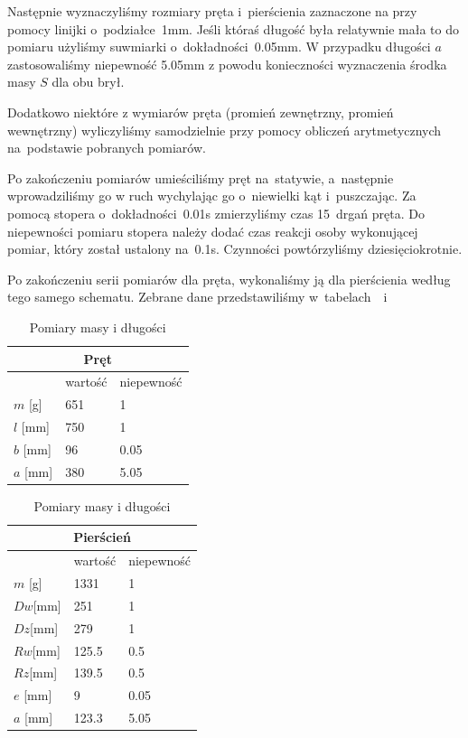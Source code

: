 \documentclass{fizraport}
\begin{document}
Następnie wyznaczyliśmy rozmiary pręta i~pierścienia zaznaczone na  przy pomocy linijki o~podziałce~1mm. Jeśli któraś długość była relatywnie mała to do pomiaru użyliśmy suwmiarki o~dokładności~0.05mm. W przypadku długości $a$ zastosowaliśmy niepewność 5.05mm z powodu konieczności wyznaczenia środka masy $S$ dla obu brył.

Dodatkowo niektóre z wymiarów pręta (promień zewnętrzny, promień wewnętrzny) wyliczyliśmy samodzielnie przy pomocy obliczeń arytmetycznych na~podstawie pobranych pomiarów.

Po zakończeniu pomiarów umieściliśmy pręt na~statywie, a~następnie wprowadziliśmy go w ruch wychylając go o~niewielki kąt i~puszczając. Za pomocą stopera o~dokładności~0.01s zmierzyliśmy czas 15~drgań pręta. Do niepewności pomiaru stopera należy dodać czas reakcji osoby wykonującej pomiar, który został ustalony na~0.1s. Czynności powtórzyliśmy dziesięciokrotnie.

Po zakończeniu serii pomiarów dla pręta, wykonaliśmy ją dla pierścienia według tego samego schematu.
Zebrane dane przedstawiliśmy w~tabelach~~i~
\begin{table}[h]
\caption{Pomiary masy i długości}
\centering

\begin{tabular}{|l|l|l|}

\hline
\multicolumn{3}{|c|}{Pręt}      \\ \hline
         & wartość & niepewność \\ \hline
$m$ [g]  & 651     & 1          \\ \hline
$l$ [mm] & 750     & 1          \\ \hline
$b$ [mm] & 96      & 0.05       \\ \hline
$a$ [mm] & 380     & 5.05       \\ \hline 
\end{tabular}
\quad
\begin{tabular}{|l|l|l|}
\hline
\multicolumn{3}{|c|}{Pierścień} \\ \hline
          & wartość & niepewność\\ \hline
$m$ [g]  & 1331    & 1          \\ \hline 
$Dw$[mm] & 251     & 1          \\ \hline
$Dz$[mm] & 279     & 1          \\ \hline
$Rw$[mm] & 125.5   & 0.5        \\ \hline 
$Rz$[mm] & 139.5   & 0.5        \\ \hline
$e$ [mm] & 9       & 0.05       \\ \hline
$a$ [mm] & 123.3   & 5.05       \\ \hline 
\end{tabular}
 \label{tab:pomiarWym}
\end{table}
\end{document}
